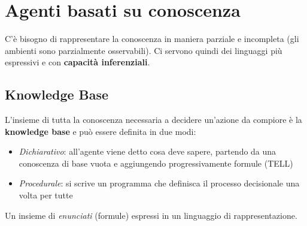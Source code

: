 \newpage
\section{Agenti basati su conoscenza}
C'è bisogno di rappresentare la conoscenza in maniera parziale e incompleta (gli ambienti sono parzialmente osservabili). Ci servono quindi dei linguaggi più espressivi e con \textbf{capacità inferenziali}.\\
\subsection{Knowledge Base}
L'insieme di tutta la conoscenza necessaria a decidere un'azione da compiore è la \textbf{knowledge base} e può essere definita in due modi:
\begin{itemize}
	\item \textit{Dichiarativo}: all'agente viene detto cosa deve sapere, partendo da una conoscenza di base vuota e aggiungendo progressivamente formule (TELL)
	\item \textit{Procedurale}: si scrive un programma che definisca il processo decisionale una volta per tutte
\end{itemize}

\begin{definition}
	Un insieme di \emph{enunciati} (formule) espressi in un linguaggio di rappresentazione.
\end{definition}

